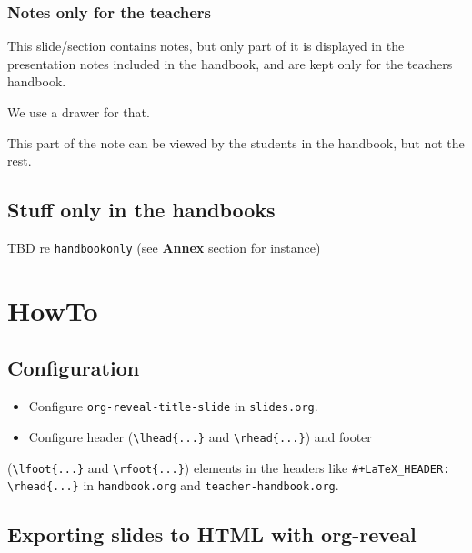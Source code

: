 \documentclass[a4paper]{article}
\begin{document}
\subsubsection{Notes only for the teachers}
\label{sec:org175d6a5}

This slide/section contains notes, but only part of it is displayed in
the presentation notes included in the handbook, and are kept only for
the teachers handbook.

We use a drawer for that.

\begin{NOTES}


This part of the note can be viewed by the students in the handbook,
but not the rest.
\end{NOTES}

\subsection{Stuff only in the handbooks}
\label{sec:org851bbfd}

TBD re \texttt{handbookonly} (see \textbf{Annex} section for instance)

\section{HowTo}
\label{sec:org5394bf3}
\subsection{Configuration}
\label{sec:org7c5c728}

\begin{itemize}
\item Configure \texttt{org-reveal-title-slide} in \texttt{slides.org}.

\item Configure header (\texttt{\textbackslash{}lhead\{...\}} and \texttt{\textbackslash{}rhead\{...\}}) and footer
\end{itemize}
(\texttt{\textbackslash{}lfoot\{...\}} and \texttt{\textbackslash{}rfoot\{...\}}) elements in the headers like \texttt{\#+LaTeX\_HEADER: \textbackslash{}rhead\{...\}}
in \texttt{handbook.org} and \texttt{teacher-handbook.org}.

\subsection{Exporting slides to HTML with org-reveal}
\label{sec:org3426e60}
\end{document}
